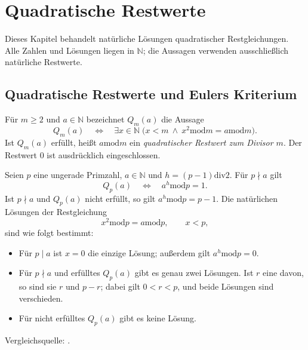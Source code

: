 \chapter{Quadratische Restwerte}
\label{b10guide:ch:quadratic-remainders}

Dieses Kapitel behandelt natürliche Lösungen quadratischer
Restgleichungen. Alle Zahlen und Lösungen liegen in $\mathbb N$;
die Aussagen verwenden ausschließlich natürliche Restwerte.

\section{Quadratische Restwerte und Eulers Kriterium}

\begin{definition}
\label{b10guide:def:quadratic-remainder}
Für $m\ge2$ und $a\in\mathbb N$ bezeichnet $Q_m(a)$ die Aussage
\[
 Q_m(a)\quad\Longleftrightarrow\quad
 \exists x\in\mathbb N\;
 \bigl(x<m\ \land\ x^2\mathbin{\mathrm{mod}}m
                       =a\mathbin{\mathrm{mod}}m\bigr).
\]
Ist $Q_m(a)$ erfüllt, heißt $a\mathbin{\mathrm{mod}}m$ ein
\emph{quadratischer Restwert zum Divisor $m$}.
Der Restwert $0$ ist ausdrücklich eingeschlossen.
\end{definition}

\begin{theorem}
\label{b10guide:thm:euler-quadratic-criterion}
Seien $p$ eine ungerade Primzahl, $a\in\mathbb N$ und
$h=(p-1)\mathbin{\mathrm{div}}2$.
Für $p\nmid a$ gilt
\[
 Q_p(a)\quad\Longleftrightarrow\quad
 a^h\mathbin{\mathrm{mod}}p=1.
\]
Ist $p\nmid a$ und $Q_p(a)$ nicht erfüllt, so gilt
$a^h\mathbin{\mathrm{mod}}p=p-1$.
Die natürlichen Lösungen der Restgleichung
\[
 x^2\mathbin{\mathrm{mod}}p=a\mathbin{\mathrm{mod}}p,
 \qquad x<p,
\]
sind wie folgt bestimmt:
\begin{itemize}
 \item Für $p\mid a$ ist $x=0$ die einzige Lösung;
       außerdem gilt $a^h\mathbin{\mathrm{mod}}p=0$.
 \item Für $p\nmid a$ und erfülltes $Q_p(a)$ gibt es genau zwei
       Lösungen. Ist $r$ eine davon, so sind sie $r$ und $p-r$;
       dabei gilt $0<r<p$, und beide Lösungen sind verschieden.
 \item Für nicht erfülltes $Q_p(a)$ gibt es keine Lösung.
\end{itemize}
Vergleichsquelle: \cite{natquadraticbasic}.
\end{theorem}

